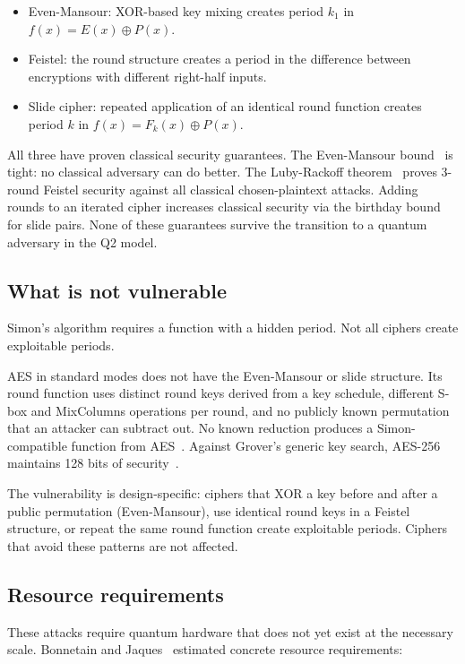 \documentclass[11pt]{article}
\begin{document}
\begin{itemize}
    \item Even-Mansour: XOR-based key mixing creates period $k_1$ in $f(x) = E(x) \oplus P(x)$.
    \item Feistel: the round structure creates a period in the difference between encryptions with different right-half inputs.
    \item Slide cipher: repeated application of an identical round function creates period $k$ in $f(x) = F_k(x) \oplus P(x)$.
\end{itemize}

All three have proven classical security guarantees. The Even-Mansour bound~\cite{dunkelman2012} is tight: no classical adversary can do better. The Luby-Rackoff theorem~\cite{luby1988} proves 3-round Feistel security against all classical chosen-plaintext attacks. Adding rounds to an iterated cipher increases classical security via the birthday bound for slide pairs. None of these guarantees survive the transition to a quantum adversary in the Q2 model.

\subsection{What is not vulnerable}

Simon's algorithm requires a function with a hidden period. Not all ciphers create exploitable periods.

AES in standard modes does not have the Even-Mansour or slide structure. Its round function uses distinct round keys derived from a key schedule, different S-box and MixColumns operations per round, and no publicly known permutation that an attacker can subtract out. No known reduction produces a Simon-compatible function from AES~\cite{zhandry2016}. Against Grover's generic key search, AES-256 maintains 128 bits of security~\cite{bernstein2009}.

The vulnerability is design-specific: ciphers that XOR a key before and after a public permutation (Even-Mansour), use identical round keys in a Feistel structure, or repeat the same round function create exploitable periods. Ciphers that avoid these patterns are not affected.

\subsection{Resource requirements}

These attacks require quantum hardware that does not yet exist at the necessary scale. Bonnetain and Jaques~\cite{bonnetain2022} estimated concrete resource requirements:
\end{document}
